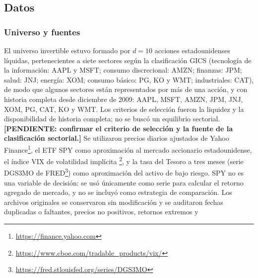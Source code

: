\subsection{Datos}\label{sec:datos}

\subsubsection{Universo y fuentes}

El universo invertible estuvo formado por $d=10$ acciones estadounidenses líquidas, 
pertenecientes a siete sectores según la clasificación GICS (tecnología de la información: AAPL y MSFT; consumo discrecional: AMZN; finanzas: JPM; salud: JNJ; energía: XOM; consumo básico: PG, KO y WMT; industriales: CAT), de modo que algunos sectores están representados por más de una acción, y con historia completa desde diciembre de 2009: AAPL, MSFT, AMZN, JPM, JNJ, XOM, PG, CAT, KO y WMT. Los criterios de selección fueron la liquidez y la disponibilidad de historia completa; no se buscó un equilibrio sectorial. \textbf{[PENDIENTE: confirmar el criterio de selección y la fuente de la clasificación sectorial.]}
 Se utilizaron precios diarios ajustados de Yahoo Finance\footnote{\url{https://finance.yahoo.com}}, el ETF SPY como aproximación al mercado accionario estadounidense, el índice VIX de volatilidad implícita \citep{whaley2000}\footnote{\url{https://www.cboe.com/tradable_products/vix/}}, y la tasa del Tesoro a tres meses (serie DGS3MO de FRED\footnote{\url{https://fred.stlouisfed.org/series/DGS3MO}}) como aproximación del activo de bajo riesgo. 
SPY no es una variable de decisión: se usó únicamente como serie para calcular el retorno agregado de mercado, y no se incluyó como estrategia de comparación.
 Los archivos originales se conservaron sin modificación y se auditaron fechas duplicadas o faltantes, precios no positivos, retornos extremos y 
